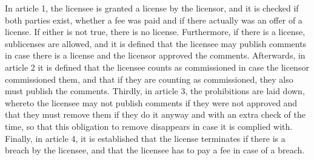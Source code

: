 \documentclass{article}
\begin{document}
In article 1, the licensee is granted a license by the licensor, and it is checked if both parties exist, whether a fee was paid and if there actually was an offer of a license. If either is not true, there is no license. Furthermore, if there is a license, sublicenses are allowed, and it is defined that the licensee may publish comments in case there is a license and the licensor approved the comments.
Afterwards, in article 2 it is defined that the licensee counts as commissioned in case the licensor commissioned them, and that if they are counting as commissioned, they also must publish the comments.
Thirdly, in article 3,  the prohibitions are laid down, whereto the licensee may not publish comments if they were not approved and that they must remove them if they do it anyway and with an extra check of the time, so that this obligation to remove disappears in case it is complied with.
Finally, in article 4, it is established that the license terminates if there is a breach by the licensee, and that the licensee has to pay a fee in case of a breach.
\end{document}
